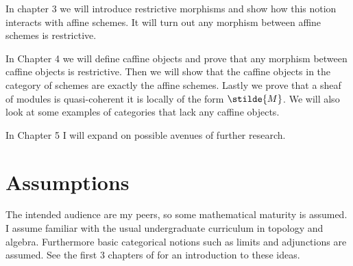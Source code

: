 In chapter 3 we will introduce restrictive morphisms and show how this notion interacts with affine schemes.
It will turn out any morphism between affine schemes is restrictive.

In Chapter 4 we will define caffine objects 
and prove that any morphism between caffine objects is restrictive.
Then we will show that the caffine objects in the category of schemes are exactly the affine schemes.
Lastly we prove that a sheaf of modules is quasi-coherent \iff it is locally of the form $\stilde{M}$. We will also look at some examples of categories that lack any caffine objects.

In Chapter 5 I will expand on possible avenues of further research.

\section{Assumptions}
The intended audience are my peers, so some mathematical maturity is assumed.
I assume familiar with the usual undergraduate curriculum in topology and algebra. Furthermore basic categorical notions such as limits and adjunctions are assumed.
See the first 3 chapters of \cite{catsUU} for an introduction to these ideas.